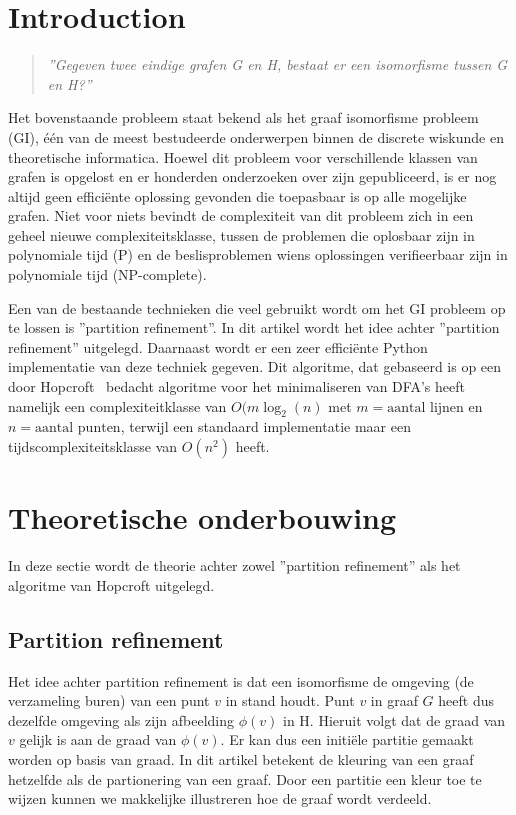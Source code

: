 \documentclass[twoside]{article}
\begin{document}
\begin{multicols}{2} %



\section*{Introduction}
\begin{quote}
\textit{''Gegeven twee eindige grafen G en H, bestaat er een isomorfisme tussen G en H?''}
\end{quote}

Het bovenstaande probleem staat bekend als het graaf isomorfisme probleem  (GI), één van de meest bestudeerde onderwerpen binnen de discrete wiskunde en theoretische informatica. Hoewel dit probleem voor verschillende klassen van grafen is opgelost  en er honderden onderzoeken over zijn gepubliceerd, is er nog altijd geen effici\"ente oplossing gevonden die toepasbaar is op alle mogelijke grafen. Niet voor niets bevindt de complexiteit van dit probleem zich in een geheel nieuwe complexiteitsklasse, tussen de problemen die oplosbaar zijn in polynomiale tijd (P) en de beslisproblemen wiens oplossingen verifieerbaar zijn in polynomiale tijd (NP-complete).

Een van de bestaande technieken die veel gebruikt wordt om het GI probleem op te lossen is ''partition refinement''. In dit artikel wordt het idee achter ''partition refinement'' uitgelegd. Daarnaast wordt er een zeer effici\"ente Python implementatie van deze techniek gegeven. Dit algoritme, dat gebaseerd is op een door Hopcroft~\cite{MR0403320} bedacht algoritme voor het minimaliseren van DFA's heeft namelijk een complexiteitklasse van $O(m \log_{2} (n)$ met $m= \text{aantal lijnen}$ en $n = \text{aantal punten}$, terwijl een standaard implementatie maar een tijdscomplexiteitsklasse van $O(n^2)$ heeft.

\section{Theoretische onderbouwing}
In deze sectie wordt de theorie achter zowel ''partition refinement'' als het algoritme van Hopcroft uitgelegd.

\subsection{Partition refinement}
Het idee achter partition refinement is dat een isomorfisme de omgeving (de verzameling buren) van een punt $v$ in stand houdt. Punt $v$ in graaf $G$ heeft dus dezelfde omgeving als zijn afbeelding $\phi(v)$ in H. Hieruit volgt dat de graad van $v$ gelijk is aan de graad van $\phi(v)$. Er kan dus een initi\"ele partitie gemaakt worden op basis van graad. In dit artikel betekent de kleuring van een graaf hetzelfde als de partionering van een graaf. Door een partitie een kleur toe te wijzen kunnen we makkelijke illustreren hoe de graaf wordt verdeeld. 


\end{multicols}
\end{document}
